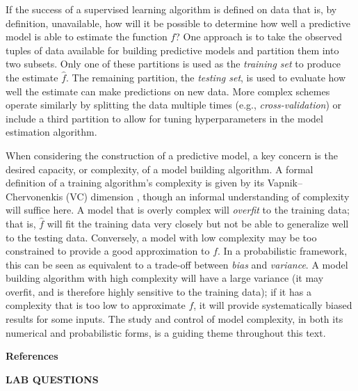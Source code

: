 \documentclass[12pt,hidelinks]{article}
\numberwithin{equation}{section}
\begin{document}
If the success of a supervised learning algorithm is defined on data that is,
by definition, unavailable, how will it be possible to determine how well a
predictive model is able to estimate the function $f$? One approach is to take
the observed tuples of data available for building predictive models and
partition them into two subsets. Only one of these partitions is used as the
\textit{training set} to produce the estimate $\widehat{f}$. The remaining
partition, the \textit{testing set}, is used to evaluate how well the estimate
can make predictions on new data. More complex schemes operate similarly by
splitting the data multiple times (e.g., \textit{cross-validation}) or
include a third partition to allow for tuning hyperparameters in the model
estimation algorithm.

When considering the construction of a predictive model, a key concern is the
desired capacity, or complexity, of a model building
algorithm. A formal definition
of a training algorithm's complexity is given by its Vapnik--Chervonenkis (VC)
dimension \cite{vapnik1971uniform}, though an informal understanding of
complexity will suffice here. A model that is overly complex will
\textit{overfit} to the training data; that is, $\widehat{f}$ will fit the
training data very closely but not be able to generalize well to the testing
data. Conversely, a model with low complexity may be too constrained to
provide a good approximation to $f$. In a probabilistic framework, this can
be seen as equivalent to a trade-off between \textit{bias} and
\textit{variance}. A model building algorithm with high complexity will have
a large variance (it may overfit, and is therefore highly sensitive to the
training data); if it has a complexity that is too low to approximate $f$, it
will provide systematically biased results for some inputs. The study and
control of model complexity, in both its numerical and probabilistic forms,
is a guiding theme throughout this text.

\renewcommand{\section}[2]{}%
\vspace{12pt}
\textbf{References}


\newpage

\textbf{LAB QUESTIONS}

\vspace*{0pt}
\end{document}
